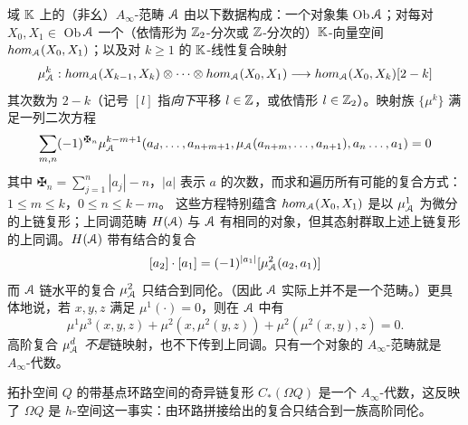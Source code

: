 域 $\mathbb{K}$ 上的（非幺）$A_{\infty}$-范畴 $\EuScript{A}$ 由以下数据构成：一个对象集 Ob$\,\EuScript{A}$；对每对 $X_0, X_1 \in$ Ob$\,\EuScript{A}$ 一个（依情形为 $\mathbb{Z}_2$-分次或 $\mathbb{Z}$-分次的）$\mathbb{K}$-向量空间 $hom_{\EuScript{A}}(X_0, X_1)$；以及对 $k \geq 1$ 的 $\mathbb{K}$-线性复合映射
\[
\mu_{\EuScript{A}}^k: hom_{\EuScript{A}}(X_{k-1},X_k) \otimes \cdots \otimes hom_{\EuScript{A}}(X_0,X_1) \longrightarrow hom_{\EuScript{A}}(X_0,X_k)[2-k]
\]
其次数为 $2-k$（记号 $[l]$ 指\emph{向下}平移 $l \in \mathbb{Z}$，或依情形 $l\in \mathbb{Z}_2$）。映射族 $\{\mu^k\}$ 满足一列二次方程
\[
\sum_{m,n} (-1)^{\maltese_n} \mu_{\scrA}^{k-m+1} (a_d,\ldots,a_{n+m+1}, \mu_{\scrA}(a_{n+m},\ldots,a_{n+1}),a_n \ldots, a_1) = 0
\]
其中 $\maltese_n = \sum_{j=1}^n |a_j|-n$，$|a|$ 表示 $a$ 的次数，而求和遍历所有可能的复合方式：$1 \leq m \leq k$，$0\leq n \leq k-m$。
这些方程特别蕴含 $hom_{\EuScript{A}}(X_0,X_1)$ 是以 $\mu^1_{\EuScript{A}}$ 为微分的上链复形；上同调范畴 $H(\EuScript{A})$ 与 $\EuScript{A}$ 有相同的对象，但其态射群取上述上链复形的上同调。$H(\EuScript{A})$ 带有结合的复合
\[
[a_2]\cdot[a_1] = (-1)^{|a_1|}[\mu_{\EuScript{A}}^2(a_2,a_1)]
\]
而 $\EuScript{A}$ 链水平的复合 $\mu_{\EuScript{A}}^2$ 只结合到同伦。（因此 $\EuScript{A}$ 实际上并不是一个范畴。）更具体地说，若 $x,y,z$ 满足 $\mu^1(\cdot) = 0$，则在 $\EuScript{A}$ 中有
\[
\mu^1\mu^3(x,y,z) + \mu^2(x,\mu^2(y,z)) + \mu^2(\mu^2(x,y),z) = 0.\]
高阶复合 $\mu_{\EuScript{A}}^d$ \emph{不是}链映射，也不下传到上同调。只有一个对象的 $A_{\infty}$-范畴就是 $A_{\infty}$-代数。

\begin{Example}
拓扑空间 $Q$ 的带基点环路空间的奇异链复形 $C_*(\Omega Q)$ 是一个 $A_{\infty}$-代数，这反映了 $\Omega Q$ 是 $h$-空间这一事实：由环路拼接给出的复合只结合到一族高阶同伦。
\end{Example}

